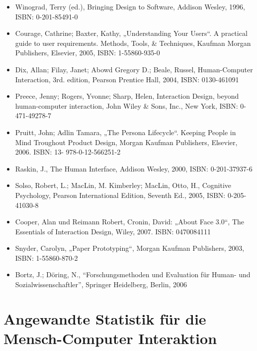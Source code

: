\begin{itemize}
\tightlist
\item
  Winograd, Terry (ed.), Bringing Design to Software, Addison Wesley,
  1996, ISBN: 0-201-85491-0
\item
  Courage, Cathrine; Baxter, Kathy, „Understanding Your Users``. A
  practical guide to user requirements. Methods, Tools, \& Techniques,
  Kaufman Morgan Publishers, Elsevier, 2005, ISBN: 1-55860-935-0
\item
  Dix, Allan; Filay, Janet; Abowd Gregory D.; Beale, Russel,
  Human-Computer Interaction, 3rd. edition, Pearson Prentice Hall, 2004,
  ISBN: 0130-461091
\item
  Preece, Jenny; Rogers, Yvonne; Sharp, Helen, Interaction Design,
  beyond human-computer interaction, John Wiley \& Sons, Inc., New York,
  ISBN: 0-471-49278-7
\item
  Pruitt, John; Adlin Tamara, „The Persona Lifecycle``. Keeping People
  in Mind Troughout Product Design, Morgan Kaufman Publishers, Elsevier,
  2006. ISBN: 13- 978-0-12-566251-2
\item
  Raskin, J., The Human Interface, Addison Wesley, 2000, ISBN:
  0-201-37937-6
\item
  Solso, Robert, L.; MacLin, M. Kimberley; MacLin, Otto, H., Cognitive
  Psychology, Pearson International Edition, Seventh Ed., 2005, ISBN:
  0-205-41030-8
\item
  Cooper, Alan und Reimann Robert, Cronin, David: „About Face 3.0``, The
  Essentials of Interaction Design, Wiley, 2007. ISBN: 0470084111
\item
  Snyder, Carolyn, „Paper Prototyping``, Morgan Kaufman Publishers,
  2003, ISBN: 1-55860-870-2
\item
  Bortz, J.; Döring, N., ``Forschungsmethoden und Evaluation für Human-
  und Sozialwissenschaftler'', Springer Heidelberg, Berlin, 2006
\end{itemize}

\chapter{Angewandte Statistik für die Mensch-Computer
Interaktion}\label{angewandte-statistik-fuxfcr-die-mensch-computer-interaktion}

